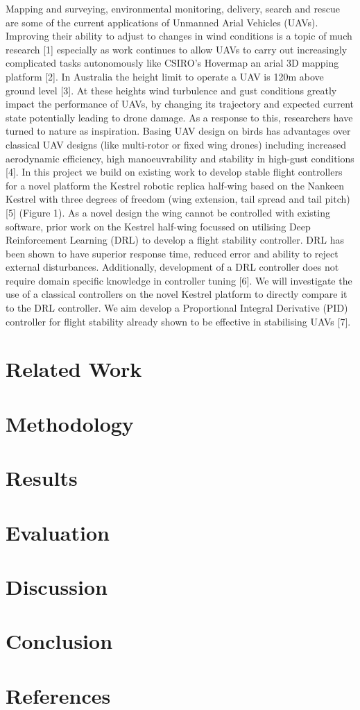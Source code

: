     Mapping and surveying, environmental monitoring, delivery, search and
    rescue are some of the current applications of Unmanned Arial Vehicles
    (UAVs). Improving their ability to adjust to changes in wind conditions
    is a topic of much research [1] especially as work continues to
    allow UAVs to carry out increasingly complicated tasks autonomously
    like CSIRO’s Hovermap an arial 3D mapping platform [2].
    \vspace{\baselineskip}
    In Australia the height limit to operate a UAV is 120m above ground
    level [3]. At these heights wind turbulence and gust conditions greatly
    impact the performance of UAVs, by changing its trajectory and expected
    current state potentially leading to drone damage. As a response to
    this, researchers have turned to nature as inspiration. Basing UAV
    design on birds has advantages over classical UAV designs (like
    multi-rotor or fixed wing drones) including increased aerodynamic
    efficiency, high manoeuvrability and stability in high-gust conditions
    [4].
    \vspace{\baselineskip}
    In this project we build on existing work to develop stable flight
    controllers for a novel platform the Kestrel robotic replica half-wing
    based on the Nankeen Kestrel with three degrees of freedom (wing
    extension, tail spread and tail pitch) [5]
    (Figure 1).
    As a novel design
    the wing cannot be controlled with existing software, prior work on the
    Kestrel half-wing focussed on utilising Deep Reinforcement Learning
    (DRL) to develop a flight stability controller. DRL has been shown
    to have superior response time, reduced error and ability to reject
    external disturbances. Additionally, development of a DRL controller
    does not require domain specific knowledge in controller tuning [6].
    \vspace{\baselineskip}
    We will investigate the use of a classical controllers on the novel
    Kestrel platform to directly compare it to the DRL controller.
    We aim develop a Proportional Integral Derivative (PID) controller
    for flight stability already shown to be effective in stabilising UAVs
    [7].
    \vspace{\baselineskip}

    \section{Related Work}
    \section{Methodology}
    \section{Results}
    \section{Evaluation}
    \section{Discussion}
    \section{Conclusion}
    \section{References}
